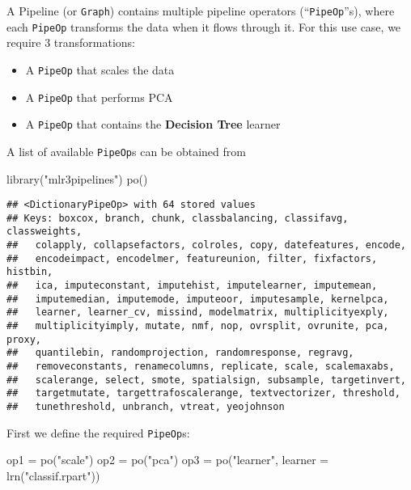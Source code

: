 \documentclass[
]{scrbook}
\newenvironment{Shaded}{\begin{snugshade}}{\end{snugshade}}
\newcommand{\AttributeTok}[1]{\textcolor[rgb]{0.77,0.63,0.00}{#1}}
\newcommand{\FunctionTok}[1]{\textcolor[rgb]{0.00,0.00,0.00}{#1}}
\newcommand{\NormalTok}[1]{#1}
\newcommand{\OtherTok}[1]{\textcolor[rgb]{0.56,0.35,0.01}{#1}}
\newcommand{\StringTok}[1]{\textcolor[rgb]{0.31,0.60,0.02}{#1}}
\providecommand{\tightlist}{%
  \setlength{\itemsep}{0pt}\setlength{\parskip}{0pt}}
\renewenvironment{Shaded} {\begin{snugshade}\small} {\end{snugshade}}
\begin{document}
A Pipeline (or \texttt{Graph}) contains multiple pipeline operators (``\texttt{PipeOp}''s), where each \texttt{PipeOp} transforms the data when it flows through it.
For this use case, we require 3 transformations:

\begin{itemize}
\tightlist
\item
  A \texttt{PipeOp} that scales the data
\item
  A \texttt{PipeOp} that performs PCA
\item
  A \texttt{PipeOp} that contains the \textbf{Decision Tree} learner
\end{itemize}

A list of available \texttt{PipeOp}s can be obtained from

\begin{Shaded}
\begin{Highlighting}[]
\FunctionTok{library}\NormalTok{(}\StringTok{"mlr3pipelines"}\NormalTok{)}
\FunctionTok{po}\NormalTok{()}
\end{Highlighting}
\end{Shaded}

\begin{verbatim}
## <DictionaryPipeOp> with 64 stored values
## Keys: boxcox, branch, chunk, classbalancing, classifavg, classweights,
##   colapply, collapsefactors, colroles, copy, datefeatures, encode,
##   encodeimpact, encodelmer, featureunion, filter, fixfactors, histbin,
##   ica, imputeconstant, imputehist, imputelearner, imputemean,
##   imputemedian, imputemode, imputeoor, imputesample, kernelpca,
##   learner, learner_cv, missind, modelmatrix, multiplicityexply,
##   multiplicityimply, mutate, nmf, nop, ovrsplit, ovrunite, pca, proxy,
##   quantilebin, randomprojection, randomresponse, regravg,
##   removeconstants, renamecolumns, replicate, scale, scalemaxabs,
##   scalerange, select, smote, spatialsign, subsample, targetinvert,
##   targetmutate, targettrafoscalerange, textvectorizer, threshold,
##   tunethreshold, unbranch, vtreat, yeojohnson
\end{verbatim}

First we define the required \texttt{PipeOp}s:

\begin{Shaded}
\begin{Highlighting}[]
\NormalTok{op1 }\OtherTok{=} \FunctionTok{po}\NormalTok{(}\StringTok{"scale"}\NormalTok{)}
\NormalTok{op2 }\OtherTok{=} \FunctionTok{po}\NormalTok{(}\StringTok{"pca"}\NormalTok{)}
\NormalTok{op3 }\OtherTok{=} \FunctionTok{po}\NormalTok{(}\StringTok{"learner"}\NormalTok{, }\AttributeTok{learner =} \FunctionTok{lrn}\NormalTok{(}\StringTok{"classif.rpart"}\NormalTok{))}
\end{Highlighting}
\end{Shaded}
\end{document}
